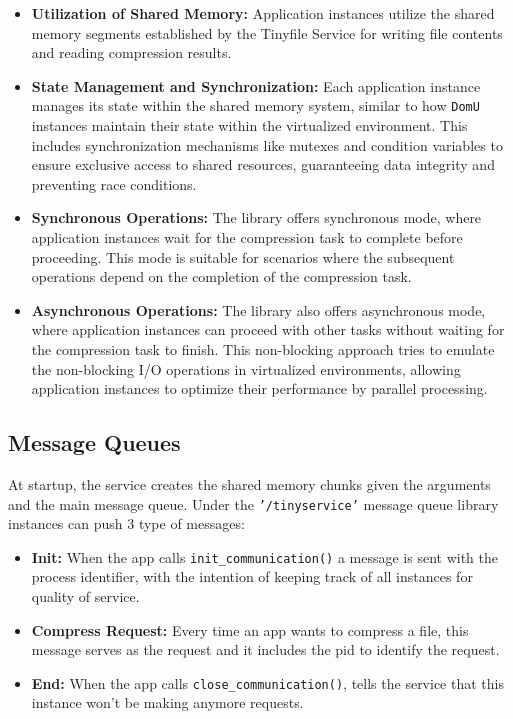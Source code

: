 \documentclass[12pt]{article}
\begin{document}
\begin{itemize}
    \item \textbf{Utilization of Shared Memory:} Application instances utilize the shared memory segments established by the Tinyfile Service for writing file contents and reading compression results.
    \item \textbf{State Management and Synchronization:} Each application instance manages its state within the shared memory system, similar to how \texttt{DomU} instances maintain their state within the virtualized environment. This includes synchronization mechanisms like mutexes and condition variables to ensure exclusive access to shared resources, guaranteeing data integrity and preventing race conditions.
	\item \textbf{Synchronous Operations:} The library offers synchronous mode, where application instances wait for the compression task to complete before proceeding. This mode is suitable for scenarios where the subsequent operations depend on the completion of the compression task.
	\item \textbf{Asynchronous Operations:} The library also offers asynchronous mode, where application instances can proceed with other tasks without waiting for the compression task to finish. This non-blocking approach tries to emulate the non-blocking I/O operations in virtualized environments, allowing application instances to optimize their performance by parallel processing.
\end{itemize}

\subsection*{Message Queues}

\par At startup, the service creates the shared memory chunks given the arguments and the main message queue. Under the \texttt{'/tinyservice'} message queue library instances can push 3 type of messages:
\begin{itemize}
    \item \textbf{Init:} When the app calls \texttt{init\_communication()} a message is sent with the process identifier, with the intention of keeping track of all instances for quality of service.
    \item \textbf{Compress Request:} Every time an app wants to compress a file, this message serves as the request and it includes the pid to identify the request. 
    \item \textbf{End:} When the app calls \texttt{close\_communication()}, tells the service that this instance won't be making anymore requests.
\end{itemize}
\end{document}
